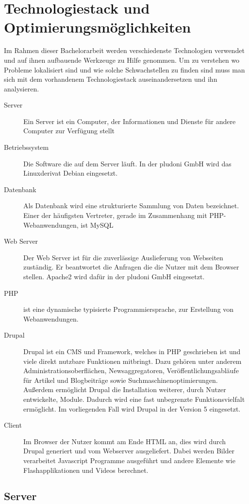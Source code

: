 \section{Technologiestack und Optimierungsmöglichkeiten}
Im Rahmen dieser Bachelorarbeit werden verschiedenste Technologien verwendet und auf ihnen aufbauende Werkzeuge zu Hilfe genommen. Um zu verstehen wo Probleme lokalisiert sind und wie solche Schwachstellen zu finden sind muss man sich mit dem vorhandenem Technologiestack auseinandersetzen und ihn analysieren.
\begin{description}
  \item[Server] Ein Server ist ein Computer, der Informationen und Dienste für andere Computer zur Verfügung stellt
  \item[Betriebssystem] Die Software die auf dem Server läuft. In der pludoni GmbH wird das Linuxderivat Debian eingesetzt.
  \item[Datenbank] Als Datenbank wird eine strukturierte Sammlung von Daten bezeichnet. Einer der häufigsten Vertreter, gerade im Zusammenhang mit PHP-Webanwendungen, ist MySQL
  \item[Web Server] Der Web Server ist für die zuverlässige Auslieferung von Webseiten zuständig. Er beantwortet die Anfragen die die Nutzer mit dem Browser stellen. Apache2 wird dafür in der pludoni GmbH eingesetzt.
  \item[PHP] ist eine dynamische typisierte Programmiersprache, zur Erstellung von Webanwendungen. %
  \item[Drupal] Drupal ist ein CMS und Framework, welches in PHP geschrieben ist und viele direkt nutzbare Funktionen mitbringt. Dazu gehören unter anderem Administrationsoberflächen, Newsaggregatoren, Veröffentlichungsabläufe für Artikel und Blogbeiträge sowie Suchmaschinenoptimierungen. Außerdem ermöglicht Drupal die Installation weiterer, durch Nutzer entwickelte, Module. Dadurch wird eine fast unbegrenzte Funktionsvielfalt ermöglicht. Im vorliegenden Fall wird Drupal in der Version 5 eingesetzt.
  \item[Client] Im Browser der Nutzer kommt am Ende HTML an, dies wird durch Drupal generiert und vom Webserver ausgeliefert. Dabei werden Bilder verarbeitet Javascript Programme ausgeführt und andere Elemente wie Flashapplikationen und Videos berechnet. 
\end{description}


\subsection{Server}
